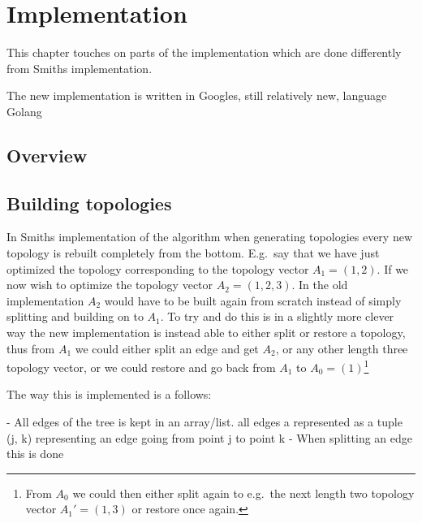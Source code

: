  {
\abnormalparskip{0pt}
\chapter{Implementation}
\label{cha:implementation}
}

This chapter touches on parts of the implementation which are done differently
from Smiths implementation.

The new implementation is written in Googles, still relatively new, language
Golang~\cite{GolangHomepage}

\section{Overview}
\label{sec:overview-1}


\section{Building topologies}
\label{sec:building-topologies}

In Smiths implementation of the algorithm when generating topologies every new
topology is rebuilt completely from the bottom.  E.g.\ say that we have just
optimized the topology corresponding to the topology vector $A_1 = (1, 2)$.  If we
now wish to optimize the topology vector $A_2 = (1, 2, 3)$.  In the old
implementation $A_2$ would have to be built again from scratch instead of simply
splitting and building on to $A_1$.  To try and do this is in a slightly more
clever way the new implementation is instead able to either split or restore a
topology, thus from $A_1$ we could either split an edge and get $A_2$, or any
other length three topology vector, or we could restore and go back from $A_1$
to $A_0 = (1)$\footnote{From $A_0$ we could then either split again to e.g.\ the
next length two topology vector $A_1' = (1, 3)$ or restore once again.}

The way this is implemented is a follows:

- All edges of the tree is kept in an array/list. all edges a represented as a
tuple (j, k) representing an edge going from point j to point k
- When splitting an edge this is done

